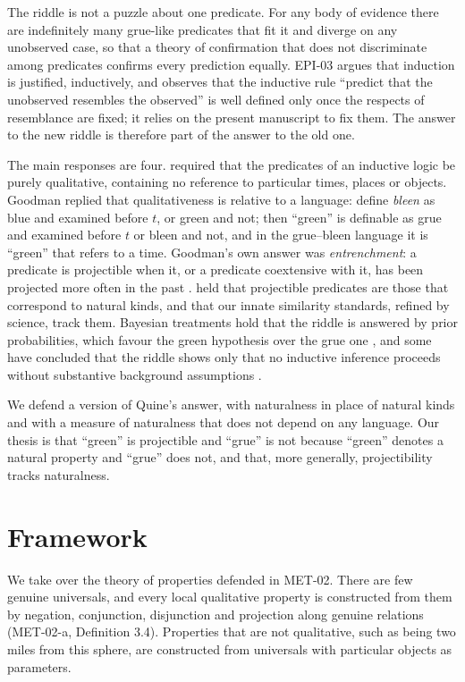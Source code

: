 \documentclass{situationist-preprint}
\begin{document}
The riddle is not a puzzle about one predicate. For any body of evidence there are indefinitely many grue-like predicates that fit it and diverge on any unobserved case, so that a theory of confirmation that does not discriminate among predicates confirms every prediction equally. EPI-03 argues that induction is justified, inductively, and observes that the inductive rule \enquote{predict that the unobserved resembles the observed} is well defined only once the respects of resemblance are fixed; it relies on the present manuscript to fix them. The answer to the new riddle is therefore part of the answer to the old one.

The main responses are four. \citet{Carnap1947} required that the predicates of an inductive logic be purely qualitative, containing no reference to particular times, places or objects. Goodman replied that qualitativeness is relative to a language: define \emph{bleen} as blue and examined before $t$, or green and not; then \enquote{green} is definable as grue and examined before $t$ or bleen and not, and in the grue--bleen language it is \enquote{green} that refers to a time. Goodman's own answer was \emph{entrenchment}: a predicate is projectible when it, or a predicate coextensive with it, has been projected more often in the past \citep[ch.~IV]{Goodman1955}. \citet{Quine1969} held that projectible predicates are those that correspond to natural kinds, and that our innate similarity standards, refined by science, track them. Bayesian treatments hold that the riddle is answered by prior probabilities, which favour the green hypothesis over the grue one \citep{Sober1994}, and some have concluded that the riddle shows only that no inductive inference proceeds without substantive background assumptions \citep{Okasha2007,Norton2006,GodfreySmith2003}.

We defend a version of Quine's answer, with naturalness in place of natural kinds and with a measure of naturalness that does not depend on any language. Our thesis is that \enquote{green} is projectible and \enquote{grue} is not because \enquote{green} denotes a natural property and \enquote{grue} does not, and that, more generally, projectibility tracks naturalness.

\section{Framework}

We take over the theory of properties defended in MET-02. There are few genuine universals, and every local qualitative property is constructed from them by negation, conjunction, disjunction and projection along genuine relations (MET-02-a, Definition 3.4). Properties that are not qualitative, such as being two miles from this sphere, are constructed from universals with particular objects as parameters.
\end{document}
